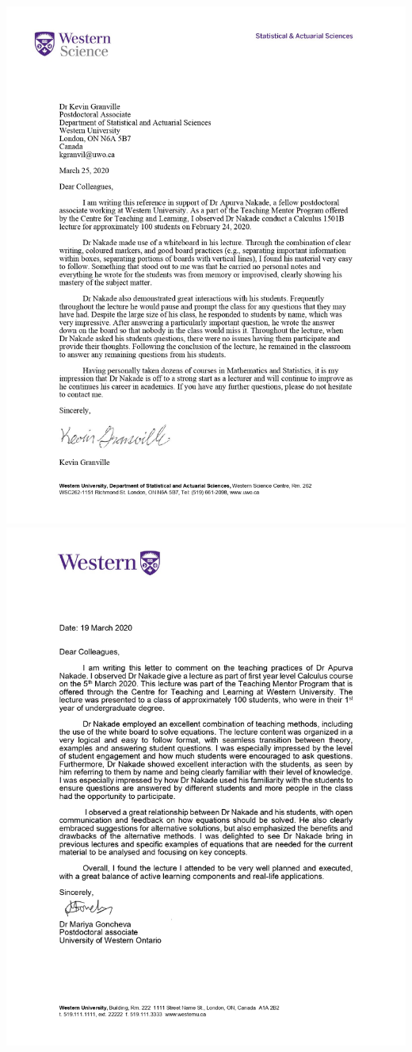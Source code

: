 \documentclass[
]{report}
\begin{document}
\includegraphics{images/2020 UWO CTL Teaching Mentor Program_page-0001.jpg}
\includegraphics{images/2020 UWO CTL Teaching Mentor Program_page-0002.jpg}
\end{document}
